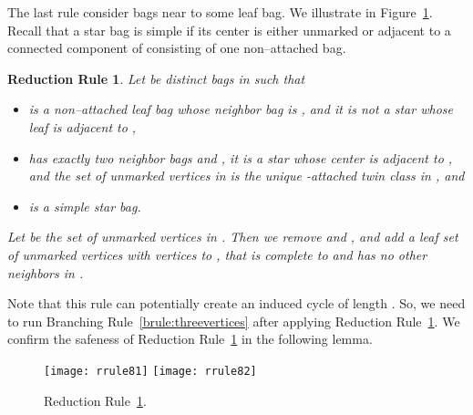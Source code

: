 \documentclass[11pt]{elsarticle}
\newtheorem{RRULE}{Reduction Rule}
\begin{document}
The last rule consider bags near to some leaf bag.
We illustrate in Figure~\ref{fig:bypassing2}.
Recall that 
a star bag  is simple if 
its center is either unmarked or adjacent to a connected component of  consisting of one non--attached bag.


\begin{RRULE}\label{rrule:bypassing2}
Let  be distinct bags in  such that  
\begin{itemize}
\item  is a non--attached leaf bag whose neighbor bag is , and it is not a star whose leaf is adjacent to , 
\item  has exactly two neighbor bags  and , it is a star whose center is adjacent to , and the set of unmarked vertices in  is the unique -attached twin class  in ,  and
\item  is a simple star bag.
\end{itemize}
Let  be the set of unmarked vertices in .
Then we remove  and , and
add a leaf set of unmarked vertices  with  vertices to , that is complete to  and has no other neighbors in .
\end{RRULE}


Note that this rule can potentially create an induced cycle of length . So, we need to run Branching Rule~\ref{brule:threevertices} after applying Reduction Rule~\ref{rrule:bypassing2}. 
We confirm the safeness of Reduction Rule~\ref{rrule:bypassing2} in the following lemma.

  \begin{figure}[t]
    
    \centering
      \texttt{[image: rrule81]}
    \qquad
      \texttt{[image: rrule82]}
        
    \caption{Reduction Rule~\ref{rrule:bypassing2}.} \label{fig:bypassing2}
      
  \end{figure}
\end{document}
